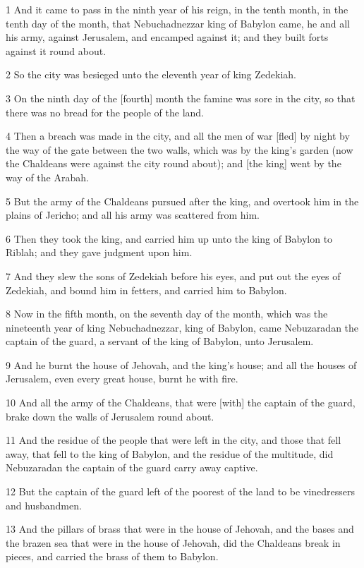 \par 1 And it came to pass in the ninth year of his reign, in the tenth month, in the tenth day of the month, that Nebuchadnezzar king of Babylon came, he and all his army, against Jerusalem, and encamped against it; and they built forts against it round about.
\par 2 So the city was besieged unto the eleventh year of king Zedekiah.
\par 3 On the ninth day of the [fourth] month the famine was sore in the city, so that there was no bread for the people of the land.
\par 4 Then a breach was made in the city, and all the men of war [fled] by night by the way of the gate between the two walls, which was by the king's garden (now the Chaldeans were against the city round about); and [the king] went by the way of the Arabah.
\par 5 But the army of the Chaldeans pursued after the king, and overtook him in the plains of Jericho; and all his army was scattered from him.
\par 6 Then they took the king, and carried him up unto the king of Babylon to Riblah; and they gave judgment upon him.
\par 7 And they slew the sons of Zedekiah before his eyes, and put out the eyes of Zedekiah, and bound him in fetters, and carried him to Babylon.
\par 8 Now in the fifth month, on the seventh day of the month, which was the nineteenth year of king Nebuchadnezzar, king of Babylon, came Nebuzaradan the captain of the guard, a servant of the king of Babylon, unto Jerusalem.
\par 9 And he burnt the house of Jehovah, and the king's house; and all the houses of Jerusalem, even every great house, burnt he with fire.
\par 10 And all the army of the Chaldeans, that were [with] the captain of the guard, brake down the walls of Jerusalem round about.
\par 11 And the residue of the people that were left in the city, and those that fell away, that fell to the king of Babylon, and the residue of the multitude, did Nebuzaradan the captain of the guard carry away captive.
\par 12 But the captain of the guard left of the poorest of the land to be vinedressers and husbandmen.
\par 13 And the pillars of brass that were in the house of Jehovah, and the bases and the brazen sea that were in the house of Jehovah, did the Chaldeans break in pieces, and carried the brass of them to Babylon.
